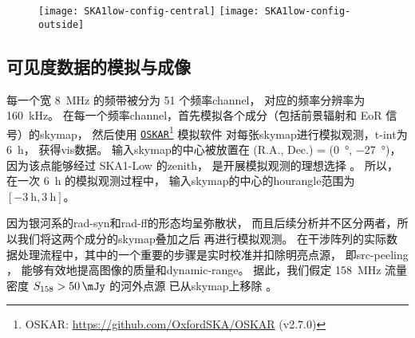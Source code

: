 \begin{figure}[htp]
  \centering
  \texttt{[image: SKA1low-config-central]}%
  \hfill%
  \texttt{[image: SKA1low-config-outside]}
  \label{fig:ska1low-config}
\end{figure}

\subsection{可见度数据的模拟与成像}

每一个宽 \SI{8}{\MHz} 的频带被分为 51 个频率\ac{channel}，
对应的频率分辨率为 \SI{160}{\kHz}。
在每一个频率\ac{channel}，首先模拟各个成分（包括前景辐射和 EoR 信号）的\ac{skymap}，
然后使用 \href{https://github.com/OxfordSKA/OSKAR}{\texttt{OSKAR}}\footnote{%
  OSKAR: \url{https://github.com/OxfordSKA/OSKAR} (v2.7.0)}
模拟软件\cite{mort2010}
对每张\ac{skymap}进行模拟观测，\ac{t-int}为 \SI{6}{\hour}，
获得\ac{vis}数据。
输入\ac{skymap}的中心被放置在
(R.A., Dec.\@) = (\SI{0}{\degree}, \SI{-27}{\degree})，
因为该点能够经过 SKA1-Low 的\ac{zenith}，
是开展模拟观测的理想选择 \cite{liu2009ps,datta2010}。
所以，在一次 \SI{6}{\hour} 的模拟观测过程中，
输入\ac{skymap}的中心的\ac{hourangle}范围为 $[\SI{-3}{\hour}, \SI{3}{\hour}]$。

因为银河系的\ac{rad-syn}和\ac{rad-ff}的形态均呈弥散状，
而且后续分析并不区分两者，所以我们将这两个成分的\ac{skymap}叠加之后
再进行模拟观测。
在干涉阵列的实际数据处理流程中，其中的一个重要的步骤是实时校准并扣除明亮点源，
即\ac{src-peeling} \cite{noordam2004,mitchell2008,intema2009}，
能够有效地提高图像的质量和\ac{dynamic-range}。
据此，我们假定 \SI{158}{\MHz} 流量密度 $S_{158} > \SI{50}{\mJy}$ 的河外点源
已从\ac{skymap}上移除 \cite{liu2009ps,pindor2011,mort2017}。

